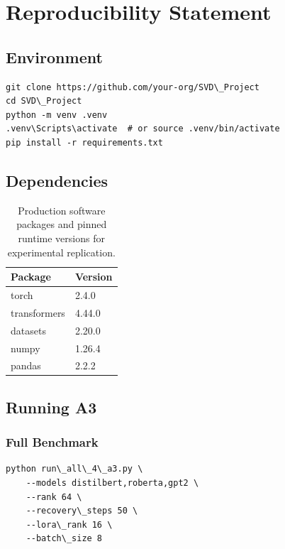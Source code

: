 
\section{Reproducibility Statement}

\subsection{Environment}

\begin{lstlisting}
git clone https://github.com/your-org/SVD\_Project
cd SVD\_Project
python -m venv .venv
.venv\Scripts\activate  # or source .venv/bin/activate
pip install -r requirements.txt
\end{lstlisting}

\subsection{Dependencies}

\begin{table}[H]
\centering
\small
\begin{tabular}{ll}
\toprule
\textbf{Package} & \textbf{Version} \\
\midrule
torch & 2.4.0 \\
transformers & 4.44.0 \\
datasets & 2.20.0 \\
numpy & 1.26.4 \\
pandas & 2.2.2 \\
\bottomrule
\end{tabular}
\caption{Production software packages and pinned runtime versions for experimental replication.}
\label{tab:repro_dependencies}
\end{table}

\subsection{Running A3}

\subsubsection{Full Benchmark}

\begin{lstlisting}
python run\_all\_4\_a3.py \
    --models distilbert,roberta,gpt2 \
    --rank 64 \
    --recovery\_steps 50 \
    --lora\_rank 16 \
    --batch\_size 8
\end{lstlisting}

